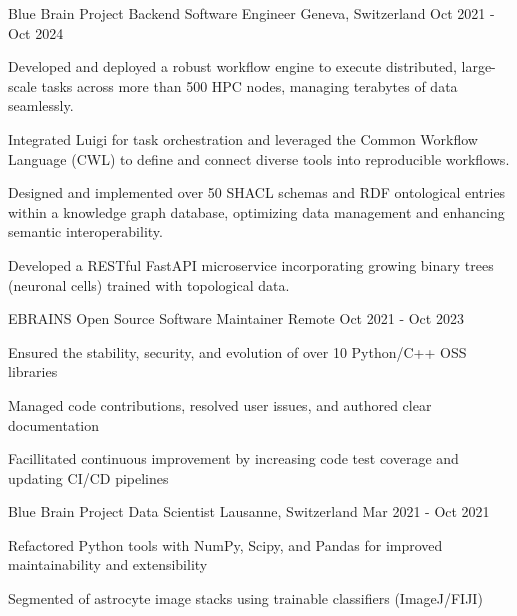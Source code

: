 \begin{cventries}
\cventry
{Blue Brain Project} %
{Backend Software Engineer} %
{Geneva, Switzerland} %
{Oct 2021 - Oct 2024} %
{ %
\begin{cvitems}
\item{Developed and deployed a robust workflow engine to execute distributed, large-scale tasks across more than 500 HPC nodes, managing terabytes of data seamlessly.}
\item{Integrated Luigi for task orchestration and leveraged the Common Workflow Language (CWL) to define and connect diverse tools into reproducible workflows.}
\item{Designed and implemented over 50 SHACL schemas and RDF ontological entries within a knowledge graph database, optimizing data management and enhancing semantic interoperability.}
\item{Developed a RESTful FastAPI microservice incorporating growing binary trees (neuronal cells) trained with topological data.}
\end{cvitems}
}

\cventry
{EBRAINS}
{Open Source Software Maintainer} %
{Remote} %
{Oct 2021 - Oct 2023} %
{ %
\begin{cvitems}
\item{Ensured the stability, security, and evolution of over 10 Python/C++ OSS libraries}
\item{Managed code contributions, resolved user issues, and authored clear documentation}
\item{Facillitated continuous improvement by increasing code test coverage and updating CI/CD pipelines}
\end{cvitems}
}



\cventry
{Blue Brain Project}
{Data Scientist} %
{Lausanne, Switzerland} %
{Mar 2021 - Oct 2021} %
{ %
\begin{cvitems}
\item{Refactored Python tools with NumPy, Scipy, and Pandas for improved maintainability and extensibility}
\item{Segmented of astrocyte image stacks using trainable classifiers (ImageJ/FIJI)}
\end{cvitems}
}


\end{cventries}
